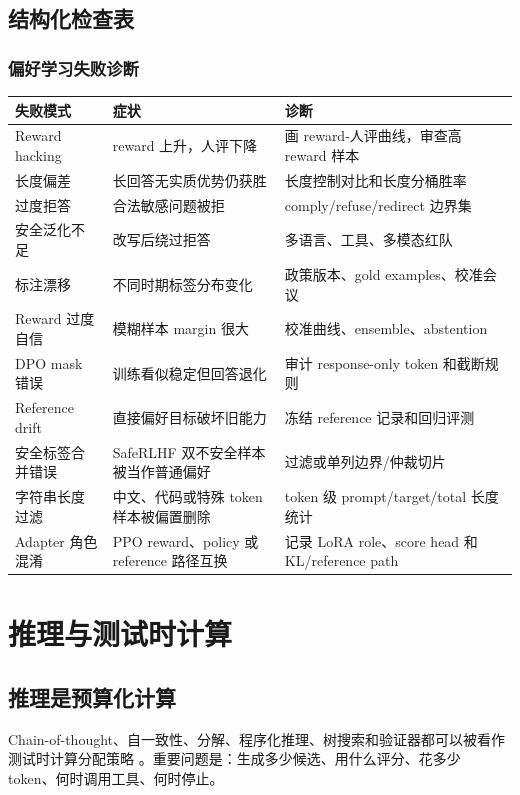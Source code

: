 \documentclass[UTF8,zihao=-4,openany]{ctexbook}
\begin{document}
\section{结构化检查表}
\subsection{偏好学习失败诊断}
\begin{center}
\begin{tabular}{p{}p{}p{}}
\toprule
失败模式 & 症状 & 诊断 \\
\midrule
Reward hacking & reward 上升，人评下降 & 画 reward-人评曲线，审查高 reward 样本 \\
长度偏差 & 长回答无实质优势仍获胜 & 长度控制对比和长度分桶胜率 \\
过度拒答 & 合法敏感问题被拒 & comply/refuse/redirect 边界集 \\
安全泛化不足 & 改写后绕过拒答 & 多语言、工具、多模态红队 \\
标注漂移 & 不同时期标签分布变化 & 政策版本、gold examples、校准会议 \\
Reward 过度自信 & 模糊样本 margin 很大 & 校准曲线、ensemble、abstention \\
DPO mask 错误 & 训练看似稳定但回答退化 & 审计 response-only token 和截断规则 \\
Reference drift & 直接偏好目标破坏旧能力 & 冻结 reference 记录和回归评测 \\
安全标签合并错误 & SafeRLHF 双不安全样本被当作普通偏好 & 过滤或单列边界/仲裁切片 \\
字符串长度过滤 & 中文、代码或特殊 token 样本被偏置删除 & token 级 prompt/target/total 长度统计 \\
Adapter 角色混淆 & PPO reward、policy 或 reference 路径互换 & 记录 LoRA role、score head 和 KL/reference path \\
\bottomrule
\end{tabular}
\end{center}

\chapter{推理与测试时计算}
\section{推理是预算化计算}
Chain-of-thought、自一致性、分解、程序化推理、树搜索和验证器都可以被看作测试时计算分配策略 \cite{wei2022chain,wang2022self,yao2023tree}。重要问题是：生成多少候选、用什么评分、花多少 token、何时调用工具、何时停止。
\end{document}
